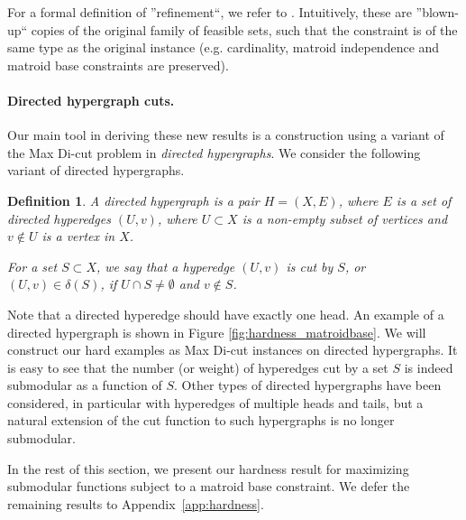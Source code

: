 \documentclass{article}[11pt]
\newtheorem{definition}[theorem]{Definition}
\begin{document}
For a formal definition of ''refinement``, we refer to \cite[Definition 1.5]{Vondrak09}.
Intuitively, these are ''blown-up`` copies of the original family of feasible sets,
such that the constraint is of the same type as the original instance (e.g. cardinality,
matroid independence and matroid base constraints are preserved).

\paragraph{Directed hypergraph cuts.}
Our main tool in deriving these new results is a construction using a variant of the Max Di-cut
problem in {\em directed hypergraphs}. We consider the following variant of directed
hypergraphs.


\begin{definition}
A directed hypergraph is a pair $H = (X,E)$, where $E$ is a set of directed hyperedges
$(U,v)$, where $U \subset X$ is a non-empty subset of vertices and $v \notin U$ is
a vertex in $X$. 

For a set $S \subset X$, we say that a hyperedge $(U,v)$ is cut by $S$, or $(U,v) \in \delta(S)$,
if $U \cap S \neq \emptyset$ and $v \notin S$.
\end{definition}

Note that a directed hyperedge should have exactly one head. 
An example of a directed hypergraph is shown in Figure \ref{fig:hardness_matroidbase}.
We will construct our hard examples as Max Di-cut instances on directed hypergraphs.
It is easy to see that the number (or weight) of  hyperedges cut by a set $S$  is indeed submodular
 as a function of $S$.
Other types of directed hypergraphs have been considered, in particular
with hyperedges of multiple heads and tails, but a natural extension of the cut
function to such hypergraphs is no longer submodular.

In the rest of this section, 
we present our hardness result 
for maximizing submodular functions subject to a matroid base constraint.
We defer the remaining results to Appendix~\ref{app:hardness}.


\iffalse
\subsection{Submodular maximization over matroid bases}
\label{subsec:matroidbase}
First we consider the problem of maximizing a submodular function subject
to a matroid base constraint. Vondrak in \cite{Vondrak09} proved a hardness
factor of $(1-1/\nu)$ when the base packing number \cite[Definition 1.2]{Vondrak09}
of the matroid is $\nu<2$. Roughly speaking, the base packing number is the
maximum number of disjoint bases of the matroid that can be embedded in an instance of the problem.
On the other hand, when there are two disjoint bases (i.e. $\nu\geq 2$),
the best known hardness result is 0.5 which is the hardness of approximating any symmetric submodular function \cite{FMV07}. We show that submodular maximizing problem when the base packing number is at least 2 is  strictly harder than the unconstrained case by showing that it can not be approximated better than 0.393.
\fi
\end{document}
